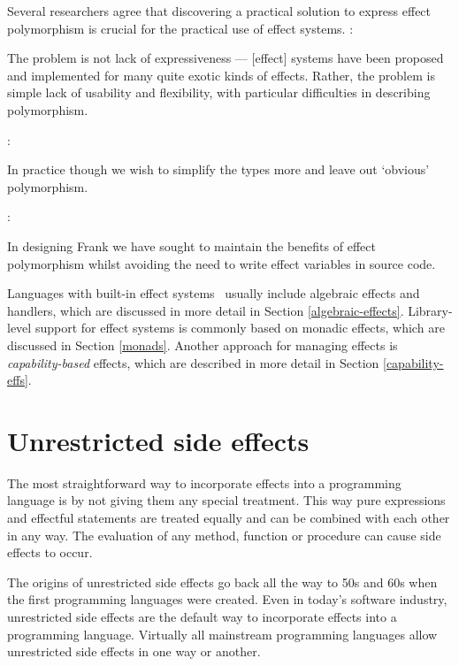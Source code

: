 Several researchers agree that discovering a practical solution to express effect polymorphism is crucial for the practical use of effect systems.
\textcite{scoped-capabilities}:
\begin{displayquote}
The problem is not lack of expressiveness --- [effect] systems have been proposed and implemented for many quite exotic kinds of effects. Rather, the problem is simple lack of usability and flexibility, with particular difficulties in describing polymorphism.
\end{displayquote}
\textcite{type-dir-alg-effs}:
\begin{displayquote}
In practice though we wish to simplify the types more and leave out ‘obvious’ polymorphism.
\end{displayquote}
\textcite{do-be-do-be-do}:
\begin{displayquote}
In designing Frank we have sought to maintain the benefits of effect polymorphism whilst avoiding the need to write effect variables in source code.
\end{displayquote}

Languages with built-in effect systems~\cite{koka-lang, frank-lang, unison-lang, ocaml-lang} usually include algebraic effects and handlers, which are discussed in more detail in Section \ref{algebraic-effects}. Library-level support for effect systems is commonly based on monadic effects, which are discussed in Section \ref{monads}. Another approach for managing effects is \emph{capability-based} effects, which are described in more detail in Section \ref{capability-effs}.



\section{Unrestricted side effects}
The most straightforward way to incorporate effects into a programming language is by not giving them any special treatment. This way pure expressions and effectful statements are treated equally and can be combined with each other in any way. The evaluation of any method, function or procedure can cause side effects to occur.

The origins of unrestricted side effects go back all the way to 50s and 60s when the first programming languages were created. Even in today's software industry, unrestricted side effects are the default way to incorporate effects into a programming language. Virtually all mainstream programming languages allow unrestricted side effects in one way or another.

